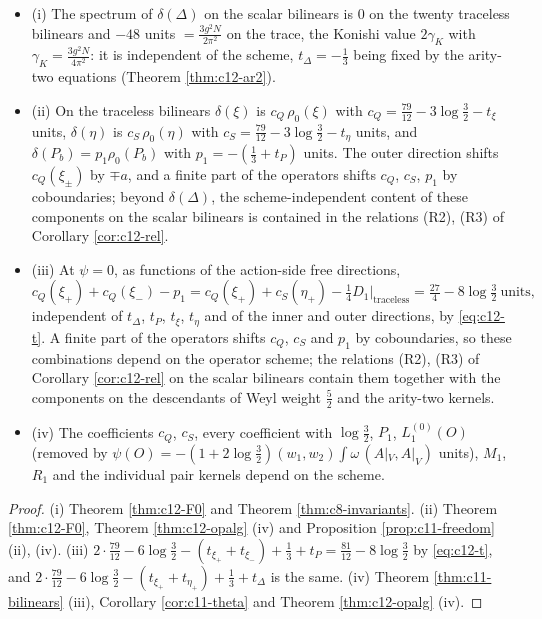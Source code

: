 \begin{corollary}
\label{cor:c12-F0inv}
\begin{itemize}
\item (i) The spectrum of $\delta(\Delta)$ on the scalar bilinears is $0$ on the twenty traceless bilinears and $-48$ units $=\tfrac{3g^2N}{2\pi^2}$ on the trace, the Konishi value $2\gamma_K$ with $\gamma_K=\tfrac{3g^2N}{4\pi^2}$: it is independent of the scheme, $t_\Delta=-\tfrac13$ being fixed by the arity-two equations (Theorem \ref{thm:c12-ar2}).
\item (ii) On the traceless bilinears $\delta(\xi)$ is $c_Q\,\rho_0(\xi)$ with $c_Q=\tfrac{79}{12}-3\log\tfrac32-t_\xi$ units, $\delta(\eta)$ is $c_S\,\rho_0(\eta)$ with $c_S=\tfrac{79}{12}-3\log\tfrac32-t_\eta$ units, and $\delta(P_b)=p_1\rho_0(P_b)$ with $p_1=-(\tfrac13+t_P)$ units. The outer direction shifts $c_Q(\xi_\pm)$ by $\mp a$, and a finite part of the operators shifts $c_Q$, $c_S$, $p_1$ by coboundaries; beyond $\delta(\Delta)$, the scheme-independent content of these components on the scalar bilinears is contained in the relations (R2), (R3) of Corollary \ref{cor:c12-rel}.
\item (iii) At $\psi=0$, as functions of the action-side free directions,
\begin{equation}
c_Q(\xi_+)+c_Q(\xi_-)-p_1=c_Q(\xi_+)+c_S(\eta_+)-\tfrac14D_1\big|_{\text{traceless}}=\tfrac{27}4-8\log\tfrac32\ \text{units},
\label{eq:c12-F0inv}
\end{equation}
independent of $t_\Delta$, $t_P$, $t_\xi$, $t_\eta$ and of the inner and outer directions, by \eqref{eq:c12-t}. A finite part of the operators shifts $c_Q$, $c_S$ and $p_1$ by coboundaries, so these combinations depend on the operator scheme; the relations (R2), (R3) of Corollary \ref{cor:c12-rel} on the scalar bilinears contain them together with the components on the descendants of Weyl weight $\tfrac52$ and the arity-two kernels.
\item (iv) The coefficients $c_Q$, $c_S$, every coefficient with $\log\tfrac32$, $P_1$, $L_1^{(0)}(O)$ (removed by $\psi(O)=-(1+2\log\tfrac32)(w_1,w_2)\int\omega\,(A|_V,A|_V)$ units), $M_1$, $R_1$ and the individual pair kernels depend on the scheme.
\end{itemize}
\end{corollary}

\begin{proof}
(i) Theorem \ref{thm:c12-F0} and Theorem \ref{thm:c8-invariants}. (ii) Theorem \ref{thm:c12-F0}, Theorem \ref{thm:c12-opalg} (iv) and Proposition \ref{prop:c11-freedom} (ii), (iv). (iii) $2\cdot\tfrac{79}{12}-6\log\tfrac32-(t_{\xi_+}+t_{\xi_-})+\tfrac13+t_P=\tfrac{81}{12}-8\log\tfrac32$ by \eqref{eq:c12-t}, and $2\cdot\tfrac{79}{12}-6\log\tfrac32-(t_{\xi_+}+t_{\eta_+})+\tfrac13+t_\Delta$ is the same. (iv) Theorem \ref{thm:c11-bilinears} (iii), Corollary \ref{cor:c11-theta} and Theorem \ref{thm:c12-opalg} (iv).
\end{proof}


